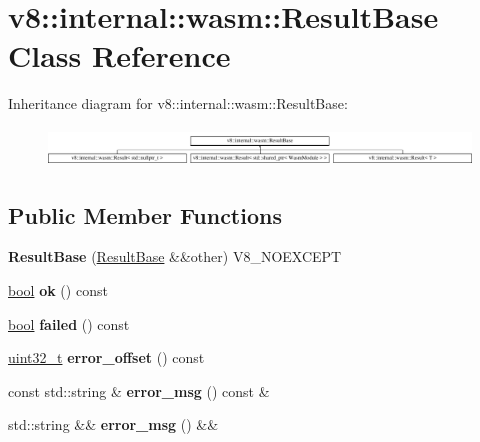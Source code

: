 \hypertarget{classv8_1_1internal_1_1wasm_1_1ResultBase}{}\section{v8\+:\+:internal\+:\+:wasm\+:\+:Result\+Base Class Reference}
\label{classv8_1_1internal_1_1wasm_1_1ResultBase}
Inheritance diagram for v8\+:\+:internal\+:\+:wasm\+:\+:Result\+Base\+:\begin{figure}[H]
\begin{center}
\leavevmode
\includegraphics[height=1.022831cm]{classv8_1_1internal_1_1wasm_1_1ResultBase}
\end{center}
\end{figure}
\subsection*{Public Member Functions}
\begin{DoxyCompactItemize}
\item 
\mbox{\label{classv8_1_1internal_1_1wasm_1_1ResultBase_a63a51750e52c8bfe4ed100037d661542}} 
{\bfseries Result\+Base} (\mbox{\hyperlink{classv8_1_1internal_1_1wasm_1_1ResultBase}{Result\+Base}} \&\&other) V8\+\_\+\+N\+O\+E\+X\+C\+E\+PT
\item 
\mbox{\label{classv8_1_1internal_1_1wasm_1_1ResultBase_a45a0c1d0adef7135542ee60320f0a197}} 
\mbox{\hyperlink{classbool}{bool}} {\bfseries ok} () const
\item 
\mbox{\label{classv8_1_1internal_1_1wasm_1_1ResultBase_a4144009cecc70325270ae1f04ac6505b}} 
\mbox{\hyperlink{classbool}{bool}} {\bfseries failed} () const
\item 
\mbox{\label{classv8_1_1internal_1_1wasm_1_1ResultBase_ae6f456ef85866c59a7a8dbd0c0148541}} 
\mbox{\hyperlink{classuint32__t}{uint32\+\_\+t}} {\bfseries error\+\_\+offset} () const
\item 
\mbox{\label{classv8_1_1internal_1_1wasm_1_1ResultBase_afba50fee31eaaabbb5304695d3142245}} 
const std\+::string \& {\bfseries error\+\_\+msg} () const \&
\item 
\mbox{\label{classv8_1_1internal_1_1wasm_1_1ResultBase_ad017fb7f94a0469013d4c33f480e4b9e}} 
std\+::string \&\& {\bfseries error\+\_\+msg} () \&\&
\end{DoxyCompactItemize}
